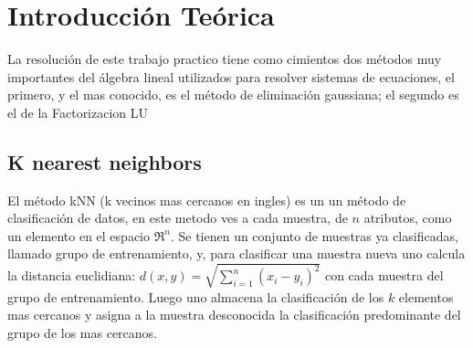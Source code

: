\documentclass[a4paper]{article}
\begin{document}
\thispagestyle{empty}


\maketitle
\newpage


\vspace{3cm}
\tableofcontents
\thispagestyle{empty}

\newpage


\begin{comment}
\begin{codesnippet}
\begin{verbatim}

struct Pepe {

    ...

};

\end{verbatim}
\end{codesnippet}
\end{comment}
\setcounter{page}{1}

\section{Introducción Teórica}

La resolución de este trabajo practico tiene como cimientos dos métodos muy importantes del álgebra lineal utilizados para resolver sistemas de ecuaciones, el primero, y el mas conocido, es el método de eliminación gaussiana; el segundo es el de la Factorizacion LU

\subsection{K nearest neighbors}
El método kNN (k vecinos mas cercanos en ingles) es un un método de clasificación de datos, en este metodo ves a cada muestra, de $n$ atributos, como un elemento en el espacio $\Re^n$. Se tienen un conjunto de muestras ya clasificadas, llamado grupo de entrenamiento, y, para clasificar una muestra nueva uno calcula la distancia euclidiana:
$d(x, y)=\sqrt{\sum_{i=1}^{n}(x_i - y_i)^2}$ 
con cada muestra del grupo de entrenamiento. Luego uno almacena la clasificación de los $k$ elementos mas cercanos y asigna a la muestra desconocida la clasificación predominante del grupo de los mas cercanos.
\end{document}
